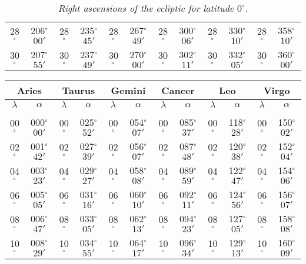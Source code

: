 \begin{table}
{\begin{tabular}{cc|cc|cc|cc|cc|cc}
28$^\circ$ & 206$^\circ$$00'$ & 28$^\circ$ & 235$^\circ$$45'$ & 28$^\circ$ & 267$^\circ$$49'$ & 28$^\circ$ & 300$^\circ$$06'$ &  28$^\circ$ & 330$^\circ$$10'$ & 28$^\circ$ & 358$^\circ$$10'$\\
30$^\circ$ & 207$^\circ$$55'$ & 30$^\circ$ & 237$^\circ$$49'$ & 30$^\circ$ & 270$^\circ$$00'$ & 30$^\circ$ & 302$^\circ$$11'$ &  30$^\circ$ & 332$^\circ$$05'$ & 30$^\circ$ & 360$^\circ$$00'$\\
\end{tabular}}
\caption{\em Right ascensions of the ecliptic for latitude $0^\circ$.}\label{tx}
\end{table}


\begin{table}
\centering
{\small \begin{tabular}{cc|cc|cc|cc|cc|cc}
\multicolumn{2}{c}{Aries}\vline & \multicolumn{2}{c}{Taurus} \vline& \multicolumn{2}{c}{Gemini} \vline& \multicolumn{2}{c}{Cancer}\vline &
\multicolumn{2}{c}{Leo}\vline & \multicolumn{2}{c}{Virgo}\\\hline
$\lambda$& $\alpha$& $\lambda$& $\alpha$& $\lambda$& $\alpha$& $\lambda$& $\alpha$& $\lambda$& $\alpha$& $\lambda$& $\alpha$\\\hline
&&&&&&&&&&&\\[-2ex]
00$^\circ$ & 000$^\circ$$00'$ & 00$^\circ$ & 025$^\circ$$52'$ & 00$^\circ$ & 054$^\circ$$07'$ & 00$^\circ$ & 085$^\circ$$37'$ & 00$^\circ$ & 118$^\circ$$28'$ & 00$^\circ$ & 150$^\circ$$02'$\\
02$^\circ$ & 001$^\circ$$42'$ & 02$^\circ$ & 027$^\circ$$39'$ & 02$^\circ$ & 056$^\circ$$07'$ & 02$^\circ$ & 087$^\circ$$48'$ & 02$^\circ$ & 120$^\circ$$38'$ & 02$^\circ$ & 152$^\circ$$04'$\\
04$^\circ$ & 003$^\circ$$23'$ & 04$^\circ$ & 029$^\circ$$27'$ & 04$^\circ$ & 058$^\circ$$08'$ & 04$^\circ$ & 089$^\circ$$59'$ & 04$^\circ$ & 122$^\circ$$47'$ & 04$^\circ$ & 154$^\circ$$06'$\\
06$^\circ$ & 005$^\circ$$05'$ & 06$^\circ$ & 031$^\circ$$16'$ & 06$^\circ$ & 060$^\circ$$10'$ & 06$^\circ$ & 092$^\circ$$11'$ & 06$^\circ$ & 124$^\circ$$56'$ & 06$^\circ$ & 156$^\circ$$07'$\\
08$^\circ$ & 006$^\circ$$47'$ & 08$^\circ$ & 033$^\circ$$05'$ & 08$^\circ$ & 062$^\circ$$13'$ & 08$^\circ$ & 094$^\circ$$23'$ & 08$^\circ$ & 127$^\circ$$05'$ & 08$^\circ$ & 158$^\circ$$08'$\\
10$^\circ$ & 008$^\circ$$29'$ & 10$^\circ$ & 034$^\circ$$55'$ & 10$^\circ$ & 064$^\circ$$17'$ & 10$^\circ$ & 096$^\circ$$34'$ & 10$^\circ$ & 129$^\circ$$13'$ & 10$^\circ$ & 160$^\circ$$09'$\\

\end{tabular}}
\end{table}

